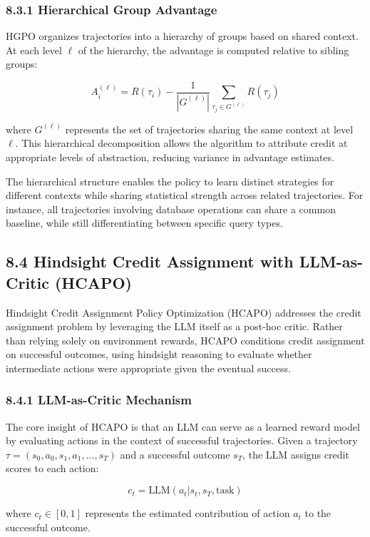 \subsubsection{8.3.1 Hierarchical Group Advantage}

HGPO organizes trajectories into a hierarchy of groups based on shared context. At each level $\ell$ of the hierarchy, the advantage is computed relative to sibling groups:

$$A_i^{(\ell)} = R(\tau_i) - \frac{1}{|G^{(\ell)}|}\sum_{\tau_j \in G^{(\ell)}} R(\tau_j)$$

where $G^{(\ell)}$ represents the set of trajectories sharing the same context at level $\ell$. This hierarchical decomposition allows the algorithm to attribute credit at appropriate levels of abstraction, reducing variance in advantage estimates.

The hierarchical structure enables the policy to learn distinct strategies for different contexts while sharing statistical strength across related trajectories. For instance, all trajectories involving database operations can share a common baseline, while still differentiating between specific query types.

\subsection{8.4 Hindsight Credit Assignment with LLM-as-Critic (HCAPO)}

Hindsight Credit Assignment Policy Optimization (HCAPO) addresses the credit assignment problem by leveraging the LLM itself as a post-hoc critic. Rather than relying solely on environment rewards, HCAPO conditions credit assignment on successful outcomes, using hindsight reasoning to evaluate whether intermediate actions were appropriate given the eventual success.

\subsubsection{8.4.1 LLM-as-Critic Mechanism}

The core insight of HCAPO is that an LLM can serve as a learned reward model by evaluating actions in the context of successful trajectories. Given a trajectory $\tau = (s_0, a_0, s_1, a_1, ..., s_T)$ and a successful outcome $s_T$, the LLM assigns credit scores to each action:

$$c_t = \text{LLM}(a_t | s_t, s_T, \text{task})$$

where $c_t \in [0, 1]$ represents the estimated contribution of action $a_t$ to the successful outcome.

